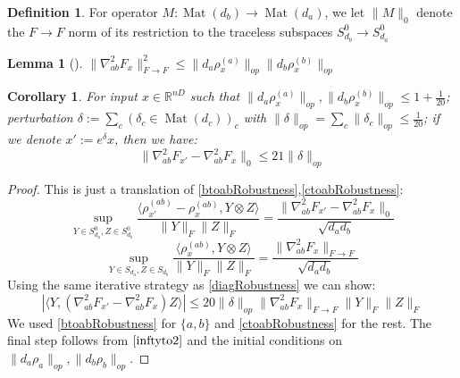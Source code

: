 \documentclass[aos]{imsart}
\newtheorem{corollary}[theorem]{Corollary}
\newtheorem{lemma}[theorem]{Lemma}
\theoremstyle{definition}
\newtheorem{definition}{Definition}
\DeclareMathOperator{\mat}{Mat}
\newcommand{\R}{{\mathbb{R}}}
\newcommand{\smallSym}{S}
\newcommand{\samp}{x}
\newcommand{\AR}[1]{{\color{orange}[AR: #1]}}
\begin{document}
\begin{appendix}
\begin{definition}
For operator $M : \mat(d_{b}) \to \mat(d_{a})$, we let $\|M\|_{0}$ denote the $F \to F$ norm of its restriction to the traceless subspaces $\smallSym^0_{d_b} \to \smallSym^0_{d_a}$
\end{definition}

\begin{lemma}[\cite{KLR19}] \label{inftyto2}
$\|\nabla^{2}_{ab} F_{\samp}\|_{F \to F}^{2} \leq \|d_{a} \rho_{\samp}^{(a)}\|_{op} \|d_{b} \rho_{\samp}^{(b)}\|_{op}$
\end{lemma}

\begin{corollary} \label{offdiagRobustness}
For input $\samp \in \R^{nD}$ such that $\|d_{a} \rho_{\samp}^{(a)}\|_{op}, \|d_{b} \rho_{\samp}^{(b)}\|_{op} \leq 1+\frac{1}{20}$; perturbation $\delta := \sum_{c} (\delta_{c} \in \mat(d_{c}))_{c}$ with $\|\delta\|_{op} = \sum_{c} \|\delta_{c}\|_{op} \leq \frac{1}{20}$; if we denote $\samp' := e^{\delta} \samp$, then we have:
\[ \|\nabla^{2}_{ab} F_{\samp'} - \nabla^{2}_{ab} F_{\samp}\|_{0} \leq 21 \|\delta\|_{op}  \]
\end{corollary}
\begin{proof}
This is just a translation of \cref{btoabRobustness},\cref{ctoabRobustness}:
\[ \sup_{Y \in \smallSym_{d_{a}}^{0}, Z \in \smallSym_{d_{b}}^{0}} \frac{\langle \rho_{\samp'}^{(ab)} - \rho_{\samp}^{(ab)}, Y \otimes Z \rangle}{\|Y\|_{F} \|Z\|_{F}} = \frac{\|\nabla^{2}_{ab} F_{\samp'} - \nabla^{2}_{ab} F_{\samp}\|_{0}}{\sqrt{d_{a} d_{b}} } \]
\[ \sup_{Y \in \smallSym_{d_{a}}, Z \in \smallSym_{d_{b}}} \frac{\langle \rho_{\samp}^{(ab)}, Y \otimes Z \rangle}{\|Y\|_{F} \|Z\|_{F}} = \frac{\|\nabla^{2}_{ab} F_{\samp}\|_{F \to F}}{\sqrt{d_{a} d_{b}} }       \]
Using the same iterative strategy as \cref{diagRobustness} we can show:
\[ |\langle Y, (\nabla^{2}_{ab} F_{\samp'} - \nabla^{2}_{ab} F_{\samp}) Z \rangle| \leq 20 \|\delta\|_{op} \|\nabla^{2}_{ab} F_{\samp}\|_{F \to F} \|Y\|_{F} \|Z\|_{F}    \]
We used \cref{btoabRobustness} for $\{a,b\}$ and \cref{ctoabRobustness} for the rest. The final step follows from $\cref{inftyto2}$ and the initial conditions on $\|d_{a} \rho_{a}\|_{op}, \|d_{b} \rho_{b}\|_{op}$.
\end{proof}


\end{appendix}
\end{document}
